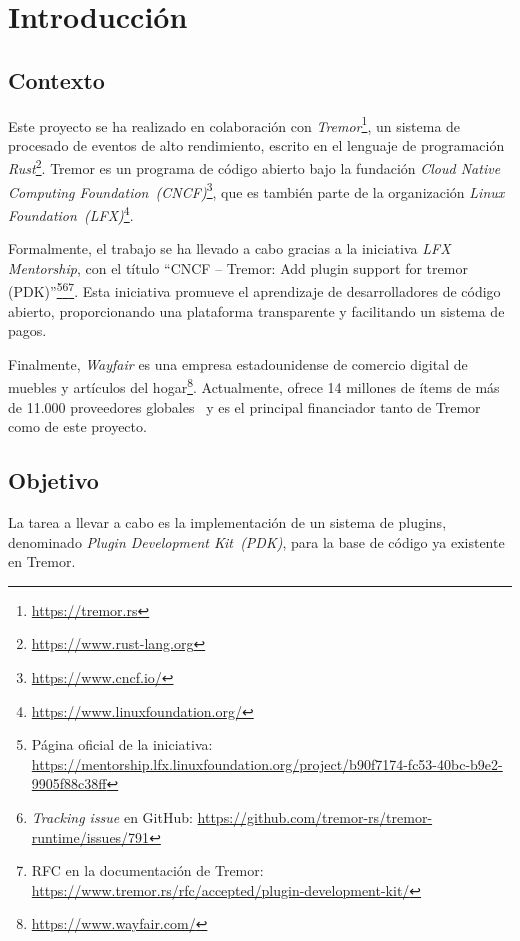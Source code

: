 
\chapter{Introducción}

\section{Contexto}

Este proyecto se ha realizado en colaboración con
\emph{Tremor}\footnote{\url{https://tremor.rs}}, un sistema de procesado de
eventos de alto rendimiento, escrito en el lenguaje de programación
\emph{Rust}\footnote{\url{https://www.rust-lang.org}}. Tremor es un programa de
código abierto bajo la fundación \emph{Cloud Native Computing
Foundation~(CNCF)}\footnote{\url{https://www.cncf.io/}}, que es también parte de
la organización \emph{Linux
Foundation~(LFX)}\footnote{\url{https://www.linuxfoundation.org/}}.

Formalmente, el trabajo se ha llevado a cabo gracias a la iniciativa \emph{LFX
Mentorship}, con el título ``CNCF -- Tremor: Add plugin support for tremor
(PDK)''\footnote{Página oficial de la iniciativa:
\url{https://mentorship.lfx.linuxfoundation.org/project/b90f7174-fc53-40bc-b9e2-9905f88c38ff}}\footnote{\emph{Tracking
issue} en GitHub:
\url{https://github.com/tremor-rs/tremor-runtime/issues/791}}\footnote{RFC en la
documentación de Tremor:
\url{https://www.tremor.rs/rfc/accepted/plugin-development-kit/}}. Esta
iniciativa promueve el aprendizaje de desarrolladores de código abierto,
proporcionando una plataforma transparente y facilitando un sistema de pagos.

Finalmente, \emph{Wayfair} es una empresa estadounidense de comercio digital de
muebles y artículos del hogar\footnote{\url{https://www.wayfair.com/}}.
Actualmente, ofrece 14 millones de ítems de más de 11.000 proveedores
globales~\cite{wayfairItems} y es el principal financiador tanto de Tremor como
de este proyecto.

\section{Objetivo}

La tarea a llevar a cabo es la implementación de un sistema de plugins,
denominado \emph{Plugin Development Kit~(PDK)}, para la base de código ya
existente en Tremor.

